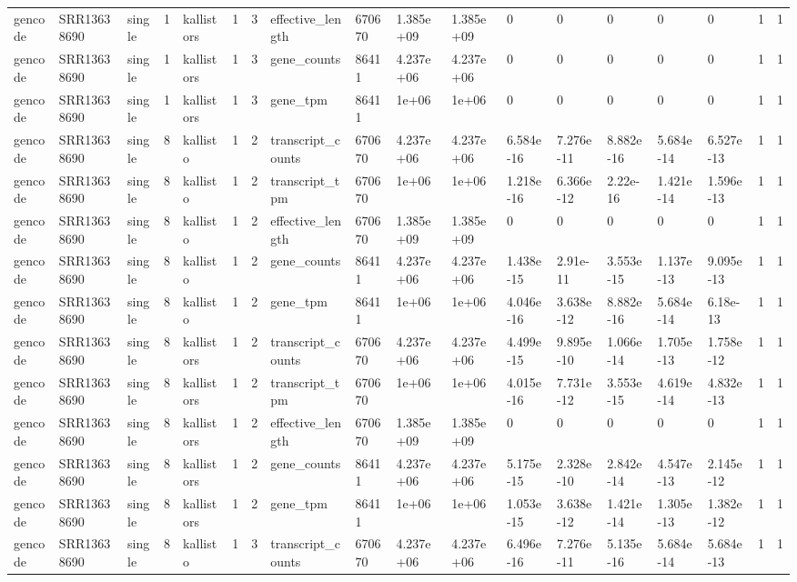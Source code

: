 \begin{tabular}{llllllllllllllllll}
gencode & SRR13638690 & single & 1 & kallistors & 1 & 3 & effective\_length & 670670 & 1.385e+09 & 1.385e+09 & 0 & 0 & 0 & 0 & 0 & 1 & 1 \\
gencode & SRR13638690 & single & 1 & kallistors & 1 & 3 & gene\_counts & 86411 & 4.237e+06 & 4.237e+06 & 0 & 0 & 0 & 0 & 0 & 1 & 1 \\
gencode & SRR13638690 & single & 1 & kallistors & 1 & 3 & gene\_tpm & 86411 & 1e+06 & 1e+06 & 0 & 0 & 0 & 0 & 0 & 1 & 1 \\
gencode & SRR13638690 & single & 8 & kallisto & 1 & 2 & transcript\_counts & 670670 & 4.237e+06 & 4.237e+06 & 6.584e-16 & 7.276e-11 & 8.882e-16 & 5.684e-14 & 6.527e-13 & 1 & 1 \\
gencode & SRR13638690 & single & 8 & kallisto & 1 & 2 & transcript\_tpm & 670670 & 1e+06 & 1e+06 & 1.218e-16 & 6.366e-12 & 2.22e-16 & 1.421e-14 & 1.596e-13 & 1 & 1 \\
gencode & SRR13638690 & single & 8 & kallisto & 1 & 2 & effective\_length & 670670 & 1.385e+09 & 1.385e+09 & 0 & 0 & 0 & 0 & 0 & 1 & 1 \\
gencode & SRR13638690 & single & 8 & kallisto & 1 & 2 & gene\_counts & 86411 & 4.237e+06 & 4.237e+06 & 1.438e-15 & 2.91e-11 & 3.553e-15 & 1.137e-13 & 9.095e-13 & 1 & 1 \\
gencode & SRR13638690 & single & 8 & kallisto & 1 & 2 & gene\_tpm & 86411 & 1e+06 & 1e+06 & 4.046e-16 & 3.638e-12 & 8.882e-16 & 5.684e-14 & 6.18e-13 & 1 & 1 \\
gencode & SRR13638690 & single & 8 & kallistors & 1 & 2 & transcript\_counts & 670670 & 4.237e+06 & 4.237e+06 & 4.499e-15 & 9.895e-10 & 1.066e-14 & 1.705e-13 & 1.758e-12 & 1 & 1 \\
gencode & SRR13638690 & single & 8 & kallistors & 1 & 2 & transcript\_tpm & 670670 & 1e+06 & 1e+06 & 4.015e-16 & 7.731e-12 & 3.553e-15 & 4.619e-14 & 4.832e-13 & 1 & 1 \\
gencode & SRR13638690 & single & 8 & kallistors & 1 & 2 & effective\_length & 670670 & 1.385e+09 & 1.385e+09 & 0 & 0 & 0 & 0 & 0 & 1 & 1 \\
gencode & SRR13638690 & single & 8 & kallistors & 1 & 2 & gene\_counts & 86411 & 4.237e+06 & 4.237e+06 & 5.175e-15 & 2.328e-10 & 2.842e-14 & 4.547e-13 & 2.145e-12 & 1 & 1 \\
gencode & SRR13638690 & single & 8 & kallistors & 1 & 2 & gene\_tpm & 86411 & 1e+06 & 1e+06 & 1.053e-15 & 3.638e-12 & 1.421e-14 & 1.305e-13 & 1.382e-12 & 1 & 1 \\
gencode & SRR13638690 & single & 8 & kallisto & 1 & 3 & transcript\_counts & 670670 & 4.237e+06 & 4.237e+06 & 6.496e-16 & 7.276e-11 & 5.135e-16 & 5.684e-14 & 5.684e-13 & 1 & 1 \\

\end{tabular}
